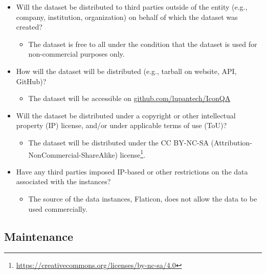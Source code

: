 \documentclass{article}
\begin{document}
\begin{itemize}
    \item Will the dataset be distributed to third parties outside of the entity (e.g., company, institution, organization) on behalf of which the dataset was created?
    \begin{itemize}
        \item The dataset is free to all under the condition that the dataset is used for non-commercial purposes only.
    \end{itemize}
    \item How will the dataset will be distributed (e.g., tarball on website, API, GitHub)?
    \begin{itemize}
        \item The dataset will be accessible on \url{github.com/lupantech/IconQA}
    \end{itemize}
    \item Will the dataset be distributed under a copyright or other intellectual property (IP) license, and/or under applicable terms of use (ToU)?
    \begin{itemize}
        \item The dataset will be distributed under the CC BY-NC-SA (Attribution-NonCommercial-ShareAlike) license\footnote{\url{https://creativecommons.org/licenses/by-nc-sa/4.0}}.
    \end{itemize}
    \item Have any third parties imposed IP-based or other restrictions on the data associated with the instances?
    \begin{itemize}
        \item The source of the data instances, Flaticon, does not allow the data to be used commercially.
    \end{itemize}

\end{itemize}

\subsection{Maintenance}
\end{document}
